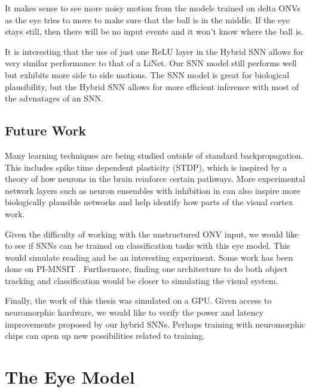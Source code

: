 \documentclass [MS] {UCLAthesis}
\begin{document}
It makes sense to see more noisy motion from the models trained on delta ONVs
as the eye tries to move to make sure that the ball is in the middle. If the eye stays
still, then there will be no input events and it won't know where the ball is.

It is interesting that the use of just one ReLU layer in the Hybrid SNN allows for very similar performance to that of a LiNet. Our SNN model still performs well but exhibits more side to side motions. The SNN model is great for biological plausibility, but the Hybrid SNN allows for more efficient inference with most of the advnatages of an SNN.


\section{Future Work}


Many learning techniques are being studied outside of standard backpropagation. This includes spike time dependent plasticity (STDP), which is inspired by a theory of how neurons in the brain reinforce certain pathways. More experimental network layers such as neuron ensembles with inhibition in \citet{nengo} can also inspire more biologically plausible networks and help identify how parts of the visual cortex work.

Given the difficulty of working with the unstructured ONV input, we would like to see if SNNs can be trained on classification tasks with this eye model. This would simulate reading and be an interesting experiment. Some work has been done on PI-MNSIT \citep{}. Furthermore, finding one architecture to do both object tracking and classification would be closer to simulating the visual system.

Finally, the work of this thesis was simulated on a GPU. Given access to neuromorphic hardware, we would like to verify the power and latency improvements proposed by our hybrid SNNs. Perhaps training with neuromorphic chips can open up new possibilities related to training.


\appendix


\chapter{The Eye Model}
\label{appendix:eye}
\end{document}
